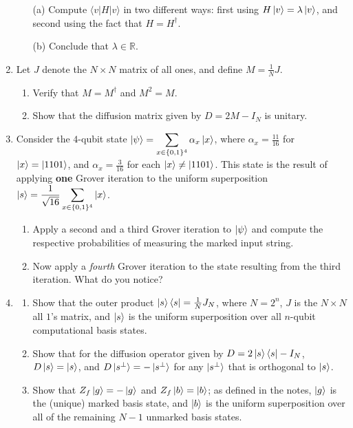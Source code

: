 \documentclass[12pt]{article}
\begin{document}
\begin{enumerate}
\begin{enumerate}
\item[(a)] Compute $\langle v|H|v\rangle$ in two different ways: first using $H\ket{v}=\lambda\ket{v}$, and second using the fact that $H=H^\dagger$.
\item[(b)] Conclude that $\lambda\in \mathbb{R}$.
\end{enumerate}
\item Let $J$ denote the $N\times N$ matrix of all ones, and define $M = \frac{1}{N} J$. 
\begin{enumerate}
    \item Verify that $M=M^{\dagger}$ and $M^2=M$.
    \item Show that the diffusion matrix given by $D=2M-I_N$ is unitary. 
\end{enumerate}
\item Consider the $4$-qubit state $\ket{\psi}=\displaystyle\sum_{x\in \{0,1\}^4} \alpha_x \ket{x}$, where $\alpha_x=\frac{11}{16}$ for $\ket{x}=\ket{1101}$, and $\alpha_x=\frac{3}{16}$ for each $\ket{x}\neq \ket{1101}$. This state is the result of applying \textbf{one} Grover iteration to the uniform superposition $\ket{s}=\dfrac{1}{\sqrt{16}}\displaystyle\sum_{x\in \{0,1\}^4} \ket{x}$.
\begin{enumerate}
    \item Apply a second and a third Grover iteration to $\ket{\psi}$ and compute the respective probabilities of measuring the marked input string. 
    \item Now apply a \textit{fourth} Grover iteration to the state resulting from the third iteration. What do you notice? 
\end{enumerate}
\item 
\begin{enumerate}
\item Show that the outer product $\ket{s}\bra{s}=\frac{1}{N}J_N$, where $N=2^n$, $J$ is the $N\times N$ all $1$'s matrix, and $\ket{s}$ is the uniform superposition over all $n$-qubit computational basis states.
\item \label{refd} Show that for the diffusion operator given by $D=2\ket{s}\bra{s}-I_N$, $D\ket{s}=\ket{s}$, and $D\ket{s^{\perp}}=-\ket{s^{\perp}}$ for any $\ket{s^{\perp}}$ that is orthogonal to $\ket{s}$.
\item \label{refz} Show that $Z_f\ket{g}=-\ket{g}$ and $Z_f\ket{b}=\ket{b}$; as defined in the notes, $\ket{g}$ is the (unique) marked basis state, and $\ket{b}$ is the uniform superposition over all of the remaining $N-1$ unmarked basis states.
\end{enumerate}
\end{enumerate}
\end{document}
